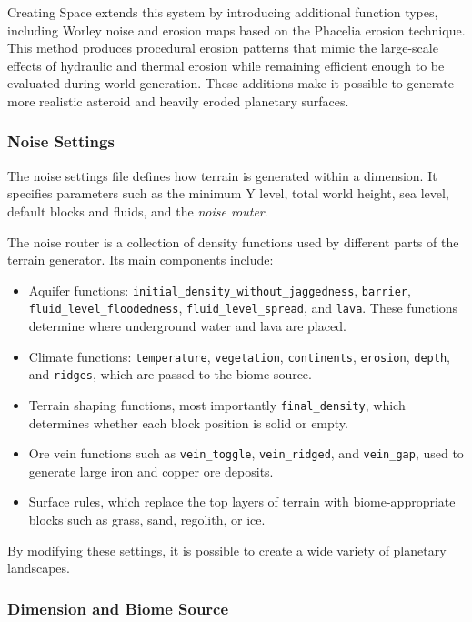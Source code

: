 \documentclass{article}
\begin{document}
Creating Space extends this system by introducing additional function types, including Worley noise and erosion maps based on the Phacelia erosion technique. This method produces procedural erosion patterns that mimic the large-scale effects of hydraulic and thermal erosion while remaining efficient enough to be evaluated during world generation. These additions make it possible to generate more realistic asteroid and heavily eroded planetary surfaces.

\subsubsection{Noise Settings}

The noise settings file defines how terrain is generated within a dimension. It specifies parameters such as the minimum Y level, total world height, sea level, default blocks and fluids, and the \textit{noise router}.

The noise router is a collection of density functions used by different parts of the terrain generator. Its main components include:

\begin{itemize}
    \item Aquifer functions: \texttt{initial\_density\_without\_jaggedness}, \texttt{barrier}, \texttt{fluid\_level\_floodedness}, \texttt{fluid\_level\_spread}, and \texttt{lava}. These functions determine where underground water and lava are placed.
    \item Climate functions: \texttt{temperature}, \texttt{vegetation}, \texttt{continents}, \texttt{erosion}, \texttt{depth}, and \texttt{ridges}, which are passed to the biome source.
    \item Terrain shaping functions, most importantly \texttt{final\_density}, which determines whether each block position is solid or empty.
    \item Ore vein functions such as \texttt{vein\_toggle}, \texttt{vein\_ridged}, and \texttt{vein\_gap}, used to generate large iron and copper ore deposits.
    \item Surface rules, which replace the top layers of terrain with biome-appropriate blocks such as grass, sand, regolith, or ice.
\end{itemize}

By modifying these settings, it is possible to create a wide variety of planetary landscapes.

\subsubsection{Dimension and Biome Source}
\end{document}
